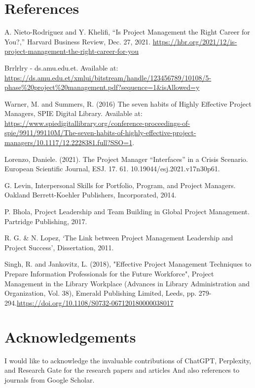 \documentclass{article}
\begin{document}
\section*{References}
\vspace*{-35pt}
\renewcommand{\refname}{}
\begin{thebibliography}{99}
A. Nieto-Rodriguez and Y. Khelifi, “Is Project Management the Right Career for You?,” Harvard Business Review, Dec. 27, 2021. \url{https://hbr.org/2021/12/is-project-management-the-right-career-for-you}

Brrlrlry - ds.amu.edu.et. Available at: 
\url{https://ds.amu.edu.et/xmlui/bitstream/handle/123456789/10108/5-phase%20project%20management.pdf?sequence=1&isAllowed=y}

Warner, M. and Summers, R. (2016) The seven habits of Highly Effective Project Managers, SPIE Digital Library. Available at: \url{https://www.spiedigitallibrary.org/conference-proceedings-of-spie/9911/99110M/The-seven-habits-of-highly-effective-project-managers/10.1117/12.2228381.full?SSO=1}. 

Lorenzo, Daniele. (2021). The Project Manager “Interfaces” in a Crisis Scenario. European Scientific Journal, ESJ. 17. 61. 10.19044/esj.2021.v17n30p61. 


G. Levin, Interpersonal Skills for Portfolio, Program, and Project Managers. Oakland Berrett-Koehler Publishers, Incorporated, 2014.


P. Bhola, Project Leadership and Team Building in Global Project Management. Partridge Publishing, 2017.


R. G. \& N. Lopez, ‘The Link between Project Management Leadership and Project Success’, Dissertation, 2011.


Singh, R. and Jankovitz, L. (2018), "Effective Project Management Techniques to Prepare Information Professionals for the Future Workforce", Project Management in the Library Workplace (Advances in Library Administration and Organization, Vol. 38), Emerald Publishing Limited, Leeds, pp. 279-294.\url{https://doi.org/10.1108/S0732-067120180000038017}


\end{thebibliography}

\newpage

\section{Acknowledgements}
I would like to acknowledge the invaluable contributions of ChatGPT, Perplexity, and Research Gate for the research papers and articles And also references to journals from Google Scholar.
\end{document}
